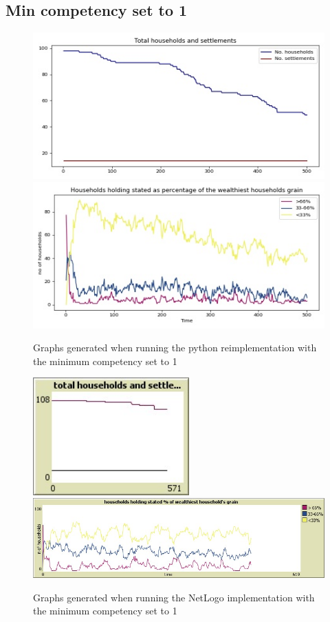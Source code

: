 \documentclass[12pt]{article}
\begin{document}
			\subsection{Min competency set to 1}
				\begin{figure}[!htb]
				\includegraphics[width=12cm]{Min_competency_run1_A}\\
				\includegraphics[width=12cm]{Min_competency_run1_B}
				\caption{Graphs generated when running the python reimplementation with the minimum competency set to 1}
				\label{fig:Min_competency_ours_1}
				\end{figure}
				
				\begin{figure}[!htb]
					\includegraphics[width=6cm]{Min_competency_run1_C}\\
					\includegraphics[width=15cm]{Min_competency_run1_D}
					\caption{Graphs generated when running the NetLogo implementation with the minimum competency set to 1}
					\label{fig:Min_competency_Netlogo_1}
				\end{figure}	
\end{document}

